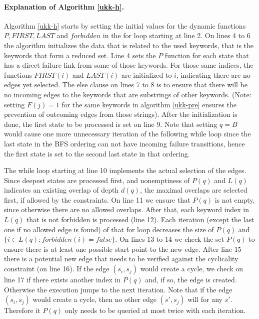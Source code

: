 \documentclass[english,twoside,censored,csm,algorithms-track-2020]{HYthesisML}
\theoremstyle{plain}
\theoremstyle{definition}
\begin{document}
\paragraph{Explanation of Algorithm \ref{ukk-h}.}
Algorithm \ref{ukk-h} starts by setting the initial values for the dynamic functions
$P, FIRST, LAST$ and $forbidden$ in the for loop starting at line 2. On lines 4 to 6 the algorithm
initializes the data that is related to the used keywords, that is the keywords that form a reduced set.
Line 4 sets the $P$ function for each state that has a direct failure link from some of
those keywords. For those same indices, the functions $FIRST(i)$ and $LAST(i)$ are initialized
to $i$, indicating there are no edges yet selected. The else clause on lines 7 to 8 is
to ensure that there will be no incoming edges to the keywords that are substrings of other
keywords. (Note: setting $F(j) = 1$ for the same keywords in algorithm \ref{ukk-pre} ensures
the prevention of outcoming edges from those strings). After the initialization is done, the
first state to be processed is set on line 9. Note that setting $q=B$ would cause one more unnecessary
iteration of the following while loop since the last state in the BFS ordering can not have
incoming failure transitions, hence the first state is set to the second last state in that
ordering.

The while loop starting at line 10 implements the actual selection of the edges. Since
deepest states are processed first, and nonemptiness of $P(q)$ and $L(q)$ indicates an existing
overlap of depth $d(q)$, the maximal overlaps are selected first, if allowed by the constraints.
On line 11 we ensure that $P(q)$ is not empty, since otherwise there are no allowed overlaps.
After that, each keyword index in $L(q)$ that is not forbidden is processed (line 12). Each
iteration (except the last one if no allowed edge is found) of that for loop decreases the
size of $P(q)$ and $\{i\in L(q) : forbidden(i) = false\}$. On lines 13 to 14 we check 
the set $P(q)$ to ensure there is at least one possible start point to the new edge. After line 15
there is a potential new edge that needs to be verified against the cyclicality constraint
(on line 16). If the edge $(s_i,s_j)$ would create a cycle, we check on line 17 if there exists
another index in $P(q)$ and, if so, the edge is created. Otherwise the execution jumps to the
next iteration. Note that if the edge $(s_i,s_j)$ would create a cycle, then no other edge $(s',s_j)$
will for any $s'$. Therefore it $P(q)$ only needs to be queried at most twice with each iteration.
\end{document}
